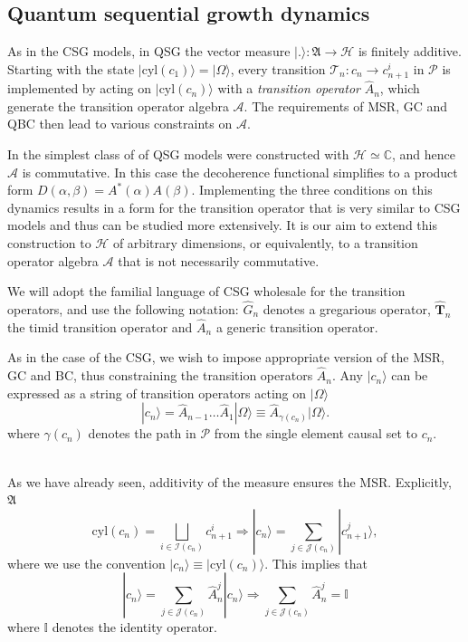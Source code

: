 \documentclass[11pt]{article}
\newcommand{\bC}{\mathbb C}
\newcommand{\cH}{\mathcal H}
\newcommand{\ket}[1]{| #1 \rangle}
\newcommand{\cyl}[1]{{\mathrm{cyl}({#1})}}
\newcommand{\cP}{\mathcal P}
\newcommand{\mA}{\mathfrak A}
\newcommand{\cT}{\mathcal T}
\newcommand{\hG}{\hat G}
\newcommand{\fA}{\mathfrak A}
\newcommand{\cA}{\mathcal A}
\newcommand{\cI}{\mathcal I}
\newcommand{\hhT}{\hat A}
\newcommand{\hTi}{\widehat{\mathbf{T}}}
\begin{document}
\subsection{Quantum sequential growth dynamics}
\label{qsgd.ssec} 



As in the CSG models, in QSG the vector measure $\ket{.}: \fA \rightarrow \cH$  
 is finitely additive.  Starting with the state $\ket{\cyl{c_1}} = \ket{\Omega}$, every transition $\cT_n: c_n
\rightarrow c_{n+1}^i$ in $\cP$ is 
implemented by acting on $\ket{\cyl{c_n}}$ with a {\sl {transition
  operator}} $\hhT_n$, which generate the transition operator algebra
$\cA$.  The requirements of MSR, GC and QBC then lead to various constraints on
$\cA$.  

In \cite{djs,sz}  the simplest class of of QSG models were
constructed with $\cH \simeq \bC$, and hence $\cA$ is commutative. In this case the     
  decoherence functional simplifies to a product form 
  $D(\alpha,\beta)=A^*(\alpha)A(\beta)$. Implementing the three
  conditions on this dynamics results in a form for the transition
  operator that is very  similar to CSG
  models and thus can be studied more extensively.  It is our aim to
  extend this construction to $\cH$ of arbitrary
  dimensions, or equivalently,  to a transition operator algebra $\cA$
  that is  not
  necessarily commutative.  



We will adopt the familial language of CSG wholesale for the transition
operators, and use the following notation: $\hG_n$ denotes a
gregarious operator, $\hTi_n$ the timid transition operator and
$\hhT_n$ a generic transition operator. 


As in the case of the CSG, we wish to impose appropriate version of
the  MSR, GC and BC, thus constraining  the transition operators
$\hhT_n$. Any $\ket{c_n} $ can be expressed as a string of transition
operators acting on $\ket{\Omega}$
\begin{equation}
\ket{c_n} = \hhT_{n-1} \ldots \hhT_1 \ket{\Omega} \equiv
\hhT_{\gamma(c_n)} \ket{\Omega}.  
  \end{equation} 
where $\gamma(c_n)$ denotes the path in $\cP$ from the single element
causal set to $c_n$. 

\\

As we have already seen, additivity of the measure ensures the
MSR. Explicitly,  
$\mA$ 
\begin{equation}
\cyl{c_n} = \bigsqcup_{i \in \cI(c_n)} {c_{n+1}^i}  \Rightarrow
\ket{c_n} =\sum_{j\in \mathcal{J}(c_n)}\ket{c_{n+1}^j}, 
\end{equation}
where we use the convention $\ket{c_n} \equiv \ket{\cyl{c_n}}$.  
This implies that 
\begin{equation} 
\ket{c_n} =\sum_{j \in \mathcal{J}(c_n)}\hhT_{n}^j \ket{c_n}
 \Rightarrow \sum_{j \in  \mathcal{J}(c_n)}\hhT_{n}^j = \mathds{I}  
\end{equation} 
 where $\mathbb{I}$ denotes the identity operator. 
\end{document}
